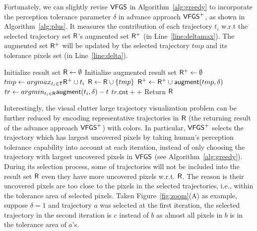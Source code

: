 Fortunately, we can slightly revise $\mathsf{VFGS}$ in Algorithm~\ref{alg:greedy} to incorporate the perception tolerance parameter $\delta$ in advance approach $\mathsf{VFGS}^{+}$, as shown in Algorithm~\ref{alg:plus}.
It measures the contribution of each trajectory $t_i$ w.r.t the selected trajectory set $\mathsf{R}$'s augmented set $\mathsf{R}^{+}$ (in Line~\ref{line:deltamax}).
The augmented set $\mathsf{R}^{+}$ will be updated by the selected trajectory $tmp$ and its tolerance pixels set (in Line~\ref{line:delta}).


\begin{algorithm}
    \caption{$\avats(\D,k=\alpha |\D|,\delta)$} \label{alg:plus}
    \begin{algorithmic}[1]
    \State Initialize result set $\mathsf{R} \leftarrow \emptyset$
    \State Initialize augmented result set $\mathsf{R}^{+} \leftarrow \emptyset$
        \State $tmp \leftarrow argmax_{t_i \in \mathsf{T}} \mathsf{R}^{+} \cup t_i$ \label{line:deltamax}
        \State $\mathsf{R} \leftarrow \mathsf{R} \cup \{ tmp \}$
        \State $\mathsf{R}^{+} \leftarrow \mathsf{R}^{+} \cup \mathsf{augment}(tmp, \delta)$\label{line:delta}
    \EndWhile
      \label{line:s}
        \State $tr \leftarrow argmin_{t_i \in \mathsf{R}}{\mathsf{augment}(t_i, \delta) - t}$
        \State $tr.\mathsf{cnt}++$ \label{line:e}
    \EndFor
    \State Return $\mathsf{R}$
    \end{algorithmic}
\end{algorithm}

Interestingly, the visual clutter large trajectory visualization problem can be further reduced
by encoding representative trajectories in $\mathsf{R}$ (the returning result of the advance approach $\mathsf{VFGS}^{+}$) with colors.
In particular, $\mathsf{VFGS}^{+}$ selects the trajectory which has largest uncovered pixels by taking human's perception tolerance capability into account at each iteration,
instead of only choosing the trajectory with largest uncovered pixels in $\mathsf{VFGS}$ (see Algorithm~\ref{alg:greedy}).
During its selection process, some of trajectories will not be included into the result set $\mathsf{R}$ even they have more uncovered pixels w.r.t. $\mathsf{R}$.
The reason is their uncovered pixels are too close to the pixels in the selected trajectories, i.e., within the tolerance area of selected pixels.
Taken Figure~\ref{fig:zoom}(A) as example, suppose $\delta=1$ and trajectory $a$ was selected at the first iteration,
the selected trajectory in the second iteration is $c$ instead of $b$ as almost all pixels in $b$ is in the tolerance area of $a$'s.

